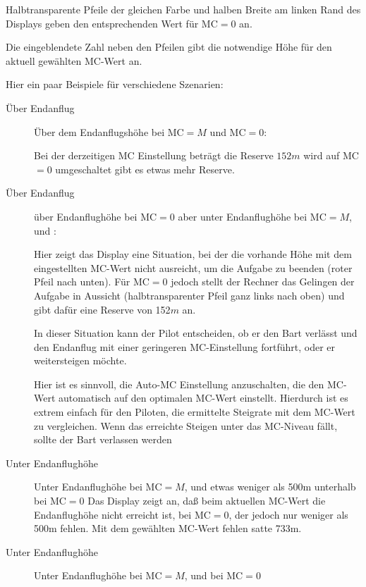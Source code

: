 Halbtransparente Pfeile der gleichen Farbe und halben Breite am linken Rand des Displays geben den entsprechenden Wert für MC$=0$ an.

Die eingeblendete Zahl neben den Pfeilen gibt die notwendige Höhe für den aktuell gewählten  MC-Wert an.

Hier ein paar Beispiele für verschiedene Szenarien:

\begin{description}
\item[Über Endanflug]
Über dem Endanflugshöhe bei  MC$=M$ und MC$=0$:

Bei der derzeitigen MC Einstellung beträgt die Reserve $152m$ wird auf MC$=0$ umgeschaltet gibt es etwas mehr Reserve.


\item[Über Endanflug]

über Endanflughöhe bei MC$=0$ aber unter Endanflughöhe bei  MC$=M$, und :

Hier zeigt  das Display eine Situation, bei der die vorhande Höhe  mit dem eingestellten MC-Wert nicht ausreicht,
um die Aufgabe zu beenden (roter Pfeil nach unten). Für MC$=0$ jedoch stellt der Rechner das Gelingen
der Aufgabe in Aussicht (halbtransparenter  Pfeil ganz links nach oben) und gibt dafür eine Reserve von 152$m$ an.

In dieser Situation kann der Pilot entscheiden, ob er den Bart verlässt und den Endanflug
mit einer geringeren MC-Einstellung fortführt, oder er weitersteigen möchte.

Hier ist es sinnvoll, die Auto-MC Einstellung anzuschalten, die den MC-Wert automatisch auf den
optimalen MC-Wert einstellt. Hierdurch ist es extrem einfach für den Piloten, die ermittelte Steigrate
mit dem MC-Wert zu vergleichen. Wenn das erreichte Steigen unter das MC-Niveau fällt,
sollte der Bart verlassen werden

\item[Unter Endanflughöhe]
Unter Endanflughöhe  bei MC$=M$, und etwas weniger als 500m  unterhalb bei MC$=0$
Das Display zeigt an, daß beim aktuellen MC-Wert die Endanflughöhe nicht erreicht ist,
bei MC$=0$, der jedoch nur weniger als 500m fehlen.
Mit dem gewählten MC-Wert fehlen satte 733m.
\item[Unter Endanflughöhe]
Unter Endanflughöhe bei  MC$=M$, und bei MC$=0$


\end{description}
